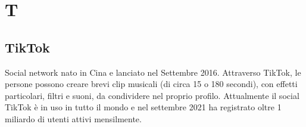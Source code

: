 \section{T}

\subsection{TikTok} Social network nato in Cina e lanciato nel Settembre 2016. Attraverso TikTok, le persone possono creare brevi clip musicali (di circa 15 o 180 secondi), con effetti particolari, filtri e suoni, da condividere nel proprio profilo. Attualmente il social TikTok è in uso in tutto il mondo e nel settembre 2021 ha registrato oltre 1 miliardo di utenti attivi mensilmente.

\clearpage